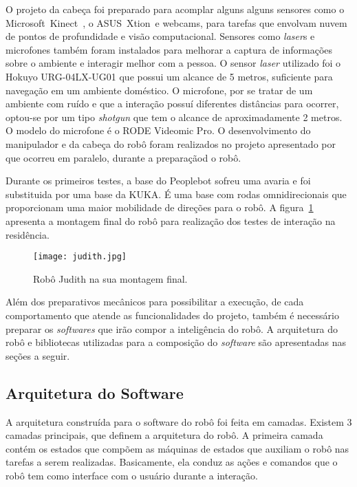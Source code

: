 O projeto da cabeça foi preparado para acomplar alguns alguns sensores como o Microsoft\textregistered\ Kinect\textregistered\ , o ASUS\textregistered\ Xtion\textregistered\ e webcams, para tarefas que envolvam nuvem de pontos de profundidade e visão computacional. Sensores como \emph{laser}s e microfones também foram instalados para melhorar a captura de informações sobre o ambiente e interagir melhor com a pessoa. O sensor \emph{laser} utilizado foi o Hokuyo URG-04LX-UG01 que possui um alcance de 5 metros, suficiente para navegação em um ambiente doméstico. O microfone, por se tratar de um ambiente com ruído e que a interação possuí diferentes distâncias para ocorrer, optou-se por um tipo \emph{shotgun} que tem o alcance de aproximadamente 2 metros. O modelo do microfone é o RODE Videomic Pro. O desenvolvimento do manipulador e da cabeça do robô foram realizados no projeto apresentado por \textcite{gonbata:2016} que ocorreu em paralelo, durante a preparaçãod o robô.

Durante os primeiros testes, a base do Peoplebot sofreu uma avaria e foi substituida por uma base da KUKA. É uma base com rodas omnidirecionais que proporcionam uma maior mobilidade de direções para o robô. A figura~\ref{fig:newjudith} apresenta a montagem final do robô para realização dos testes de interação na residência.

\begin{figure}[ht!]
	\centering
	\begin{minipage}{0.4\textwidth}
		\caption{Robô Judith na sua montagem final.}
		\texttt{[image: judith.jpg]}
		\label{fig:newjudith}
	\end{minipage}
\end{figure}

Além dos preparativos mecânicos para possibilitar a execução, de cada comportamento que atende as funcionalidades do projeto, também é necessário preparar os \emph{softwares} que irão compor a inteligência do robô. A arquitetura do robô e bibliotecas utilizadas para a composição do \emph{software} são apresentadas nas seções a seguir.

\subsection{Arquitetura do Software}
\label{sec:arquitetura}
A arquitetura construída para o software do robô foi feita em camadas. Existem 3 camadas principais, que definem a arquitetura do robô. A primeira camada contém os estados que compõem as máquinas de estados que auxiliam o robô nas tarefas a serem realizadas. Basicamente, ela conduz as ações e comandos que o robô tem como interface com o usuário durante a interação.

